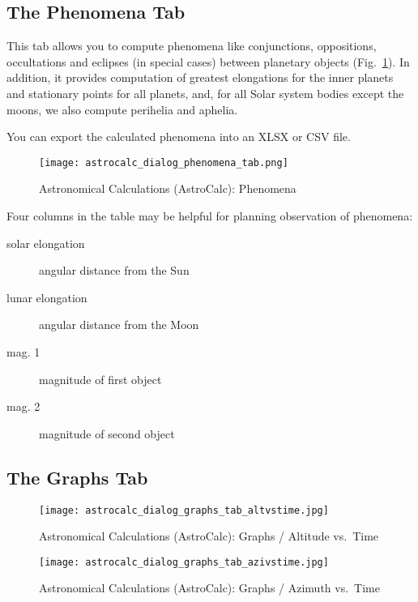 \subsection{The Phenomena Tab}
\label{sec:gui:AstroCalc:Phenomena}

This tab allows you to compute phenomena like conjunctions, oppositions, 
occultations and eclipses (in special cases) between planetary objects 
(Fig.~\ref{fig:gui:AstroCalc:Phenomena}). 
In addition,  it provides computation of greatest 
elongations for the inner planets and stationary points for all planets, and,
for all Solar system bodies except the moons, we also compute perihelia and aphelia.

You can export the calculated phenomena into an XLSX or CSV file.

\begin{figure}[tbp]
\centering\texttt{[image: astrocalc\_dialog\_phenomena\_tab.png]}
\caption{Astronomical Calculations (AstroCalc): Phenomena}
\label{fig:gui:AstroCalc:Phenomena}
\end{figure}

Four columns in the table may be helpful for planning observation of phenomena:
\begin{description}
  \item[solar elongation] angular distance from the Sun
  \item[lunar elongation] angular distance from the Moon
  \item[mag. 1] magnitude of first object
  \item[mag. 2] magnitude of second object
\end{description}


\subsection{The Graphs Tab}
\label{sec:gui:AstroCalc:Graphs}

\begin{figure}[p]
\centering\texttt{[image: astrocalc\_dialog\_graphs\_tab\_altvstime.jpg]}
\caption{Astronomical Calculations (AstroCalc): Graphs / Altitude vs.\ Time}
\label{fig:gui:AstroCalc:Graphs:AltVsTime}
\end{figure}
\begin{figure}[p]
\centering\texttt{[image: astrocalc\_dialog\_graphs\_tab\_azivstime.jpg]}
\caption{Astronomical Calculations (AstroCalc): Graphs / Azimuth vs.\ Time}
\label{fig:gui:AstroCalc:Graphs:AziVsTime}
\end{figure}

